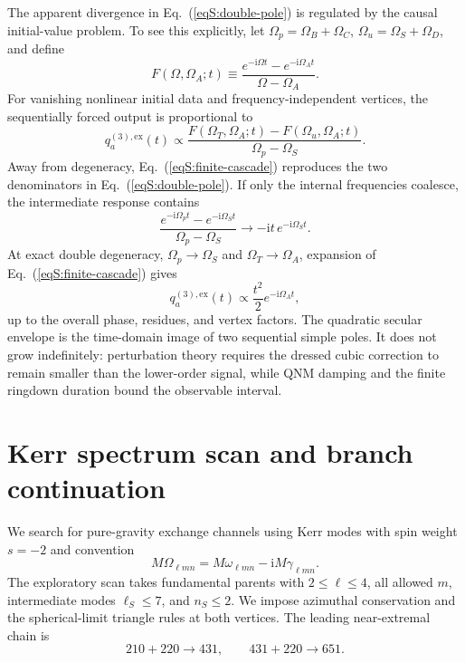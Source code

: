 \documentclass[
 reprint,
 amsmath,amssymb,
 aps,
 prl,
 superscriptaddress,
 nofootinbib
]{revtex4-2}
\newcommand{\Om}{\Omega}
\newcommand{\ii}{\mathrm{i}}
\begin{document}
The apparent divergence in Eq.~(\ref{eqS:double-pole}) is regulated by the
causal initial-value problem. To see this explicitly, let
\(\Om_p=\Om_B+\Om_C\), \(\Om_u=\Om_S+\Om_D\), and define
\begin{equation}
F(\Om,\Om_A;t)
\equiv
\frac{e^{-\ii\Om t}-e^{-\ii\Om_A t}}{\Om-\Om_A}.
\label{eqS:F}
\end{equation}
For vanishing nonlinear initial data and frequency-independent vertices, the
sequentially forced output is proportional to
\begin{equation}
q_a^{(3),\mathrm{ex}}(t)
\propto
\frac{F(\Om_T,\Om_A;t)-F(\Om_u,\Om_A;t)}
{\Om_p-\Om_S}.
\label{eqS:finite-cascade}
\end{equation}
Away from degeneracy, Eq.~(\ref{eqS:finite-cascade}) reproduces the two
denominators in Eq.~(\ref{eqS:double-pole}). If only the internal frequencies
coalesce, the intermediate response contains
\begin{equation}
\frac{e^{-\ii\Om_p t}-e^{-\ii\Om_S t}}
{\Om_p-\Om_S}
\longrightarrow
-\ii t\,e^{-\ii\Om_S t}.
\label{eqS:single-secular}
\end{equation}
At exact double degeneracy,
\(\Om_p\to\Om_S\) and \(\Om_T\to\Om_A\), expansion of
Eq.~(\ref{eqS:finite-cascade}) gives
\begin{equation}
q_a^{(3),\mathrm{ex}}(t)
\propto
\frac{t^2}{2}e^{-\ii\Om_A t},
\label{eqS:double-secular}
\end{equation}
up to the overall phase, residues, and vertex factors. The quadratic secular
envelope is the time-domain image of two sequential simple poles. It does not
grow indefinitely: perturbation theory requires the dressed cubic correction
to remain smaller than the lower-order signal, while QNM damping and the
finite ringdown duration bound the observable interval.

\section{Kerr spectrum scan and branch continuation}

We search for pure-gravity exchange channels using Kerr modes with spin weight
\(s=-2\) and convention
\begin{equation}
M\Om_{\ell mn}=M\omega_{\ell mn}-\ii M\gamma_{\ell mn}.
\end{equation}
The exploratory scan takes fundamental parents with
\(2\leq\ell\leq4\), all allowed \(m\), intermediate modes
\(\ell_S\leq7\), and \(n_S\leq2\). We impose azimuthal conservation and the
spherical-limit triangle rules at both vertices. The leading near-extremal
chain is
\begin{equation}
210+220\rightarrow431,\qquad431+220\rightarrow651.
\label{eqS:chain}
\end{equation}
\end{document}

